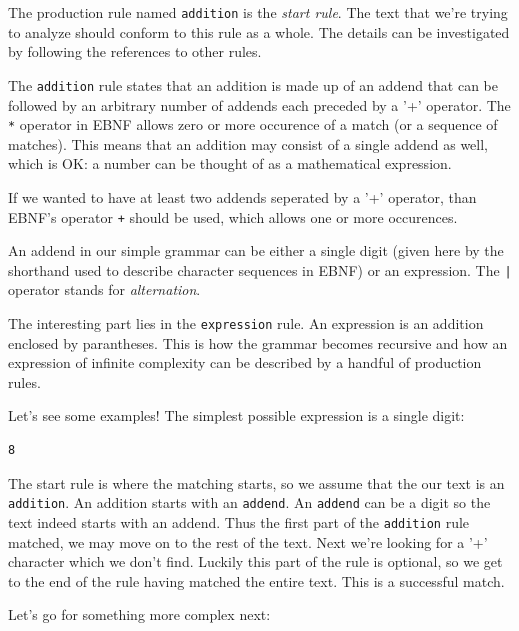 \documentclass[12pt]{article}
\begin{document}
The production rule named \texttt{addition} is the \emph{start rule}. The text that we're trying to analyze
should conform to this rule as a whole. The details can be investigated by following the references to other
rules.

The \texttt{addition} rule states that an addition is made up of an addend that can be followed by an
arbitrary number of addends each preceded by a '+' operator. The \texttt{*} operator in EBNF allows zero or
more occurence of a match (or a sequence of matches). This means that an addition may consist of a single
addend as well, which is OK: a number can be thought of as a mathematical expression.

If we wanted to have at least two addends seperated by a '+' operator, than EBNF's operator \texttt{+} should
be used, which allows one or more occurences.

An addend in our simple grammar can be either a single digit (given here by the shorthand used to describe
character sequences in EBNF) or an expression. The \texttt{|} operator stands for \emph{alternation}.

The interesting part lies in the \texttt{expression} rule. An expression is an addition enclosed by
parantheses. This is how the grammar becomes recursive and how an expression of infinite complexity can be
described by a handful of production rules.

Let's see some examples! The simplest possible expression is a single digit:

\begin{center}
	\begin{minipage}[h]{0.1\textwidth}
		\begin{lstlisting}[breaklines=true]
8
		\end{lstlisting}
	\end{minipage}
\end{center}

The start rule is where the matching starts, so we assume that the our text is an \texttt{addition}. An addition starts
with an \texttt{addend}. An \texttt{addend} can be a digit so the text indeed starts with an addend. Thus the
first part of the \texttt{addition} rule matched, we may move on to the rest of the text. Next we're looking
for a '+' character which we don't find. Luckily this part of the rule is optional, so we get to the end of
the rule having matched the entire text. This is a successful match.

Let's go for something more complex next:
\end{document}
